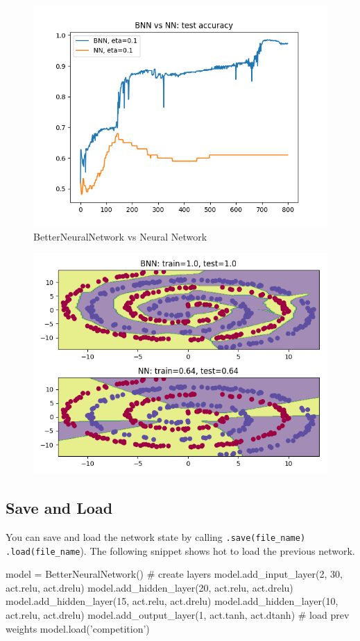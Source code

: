 \documentclass[11pt]{article}
\begin{document}
\begin{figure}[H]
\includegraphics[scale=0.5]{images/BNN_vs_NN/BNN_vs_NN_test_accuracy}
\caption{BetterNeuralNetwork vs Neural Network}
\label{fig: bnnVsNn}

\end{figure}


\begin{figure}[H]
\centering
	\includegraphics[scale=0.6]{images/BNN_vs_NN/BNN_vs_NN_boundary}
\end{figure}
\subsection{Save and Load}
You can save and load the network state by calling \texttt{.save(file\_name)} \texttt{.load(file\_name}). The following snippet shows hot to load the previous network.

\begin{python}
model = BetterNeuralNetwork()
# create layers
model.add_input_layer(2, 30, act.relu, act.drelu)
model.add_hidden_layer(20, act.relu, act.drelu)
model.add_hidden_layer(15, act.relu, act.drelu)
model.add_hidden_layer(10, act.relu, act.drelu)
model.add_output_layer(1, act.tanh, act.dtanh)
# load prev weights
model.load('competition')
\end{python}

\newpage
\printbibliography
\end{document}
